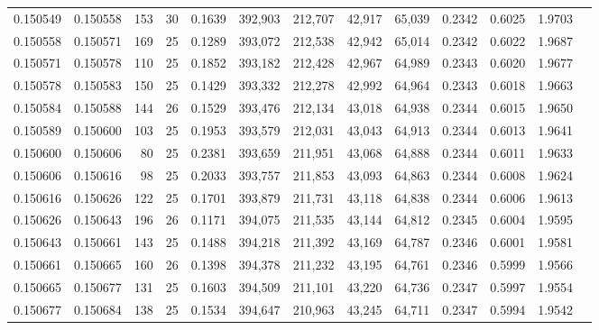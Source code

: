\begin{tabular}{rrrrrrrrrrrrr}
0.150549 & 0.150558 & 153 &  30 &                                     0.1639 & 392,903 & 212,707 &  42,917 &  65,039 & 0.2342 & 0.6025 & 1.9703 \\
0.150558 & 0.150571 & 169 &  25 &                                     0.1289 & 393,072 & 212,538 &  42,942 &  65,014 & 0.2342 & 0.6022 & 1.9687 \\
0.150571 & 0.150578 & 110 &  25 &                                     0.1852 & 393,182 & 212,428 &  42,967 &  64,989 & 0.2343 & 0.6020 & 1.9677 \\
0.150578 & 0.150583 & 150 &  25 &                                     0.1429 & 393,332 & 212,278 &  42,992 &  64,964 & 0.2343 & 0.6018 & 1.9663 \\
0.150584 & 0.150588 & 144 &  26 &                                     0.1529 & 393,476 & 212,134 &  43,018 &  64,938 & 0.2344 & 0.6015 & 1.9650 \\
0.150589 & 0.150600 & 103 &  25 &                                     0.1953 & 393,579 & 212,031 &  43,043 &  64,913 & 0.2344 & 0.6013 & 1.9641 \\
0.150600 & 0.150606 &  80 &  25 &                                     0.2381 & 393,659 & 211,951 &  43,068 &  64,888 & 0.2344 & 0.6011 & 1.9633 \\
0.150606 & 0.150616 &  98 &  25 &                                     0.2033 & 393,757 & 211,853 &  43,093 &  64,863 & 0.2344 & 0.6008 & 1.9624 \\
0.150616 & 0.150626 & 122 &  25 &                                     0.1701 & 393,879 & 211,731 &  43,118 &  64,838 & 0.2344 & 0.6006 & 1.9613 \\
0.150626 & 0.150643 & 196 &  26 &                                     0.1171 & 394,075 & 211,535 &  43,144 &  64,812 & 0.2345 & 0.6004 & 1.9595 \\
0.150643 & 0.150661 & 143 &  25 &                                     0.1488 & 394,218 & 211,392 &  43,169 &  64,787 & 0.2346 & 0.6001 & 1.9581 \\
0.150661 & 0.150665 & 160 &  26 &                                     0.1398 & 394,378 & 211,232 &  43,195 &  64,761 & 0.2346 & 0.5999 & 1.9566 \\
0.150665 & 0.150677 & 131 &  25 &                                     0.1603 & 394,509 & 211,101 &  43,220 &  64,736 & 0.2347 & 0.5997 & 1.9554 \\
0.150677 & 0.150684 & 138 &  25 &                                     0.1534 & 394,647 & 210,963 &  43,245 &  64,711 & 0.2347 & 0.5994 & 1.9542 \\

\end{tabular}
